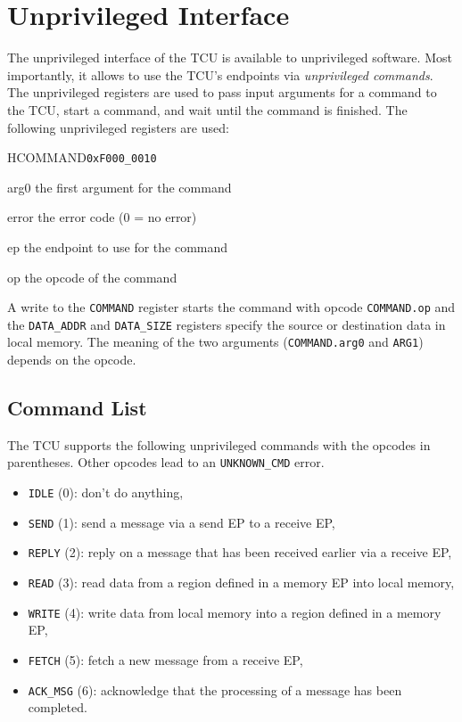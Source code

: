\chapter{Unprivileged Interface}

The unprivileged interface of the TCU is available to unprivileged software. Most importantly, it
allows to use the TCU's endpoints via \emph{unprivileged commands}. The unprivileged registers are
used to pass input arguments for a command to the TCU, start a command, and wait until the command
is finished. The following unprivileged registers are used:

\begin{register}{H}{COMMAND}{\texttt{0xF000\_0010}}
  \regnewline%
  \begin{regdesc}\begin{reglist}
    \item[arg0] the first argument for the command
    \item[error] the error code (0 = no error)
    \item[ep] the endpoint to use for the command
    \item[op] the opcode of the command
  \end{reglist}\end{regdesc}
\end{register}

\noindent A write to the \texttt{COMMAND} register starts the command with opcode
\texttt{COMMAND.op} and the \texttt{DATA\_ADDR} and \texttt{DATA\_SIZE} registers specify the source
or destination data in local memory. The meaning of the two arguments (\texttt{COMMAND.arg0} and
\texttt{ARG1}) depends on the opcode.

\section{Command List}

The TCU supports the following unprivileged commands with the opcodes in parentheses. Other opcodes
lead to an \texttt{UNKNOWN\_CMD} error.

\begin{itemize}
  \item \texttt{IDLE} (0): don't do anything,
  \item \texttt{SEND} (1): send a message via a send EP to a receive EP,
  \item \texttt{REPLY} (2): reply on a message that has been received earlier via a receive EP,
  \item \texttt{READ} (3): read data from a region defined in a memory EP into local memory,
  \item \texttt{WRITE} (4): write data from local memory into a region defined in a memory EP,
  \item \texttt{FETCH} (5): fetch a new message from a receive EP,
  \item \texttt{ACK\_MSG} (6): acknowledge that the processing of a message has been completed.
\end{itemize}

